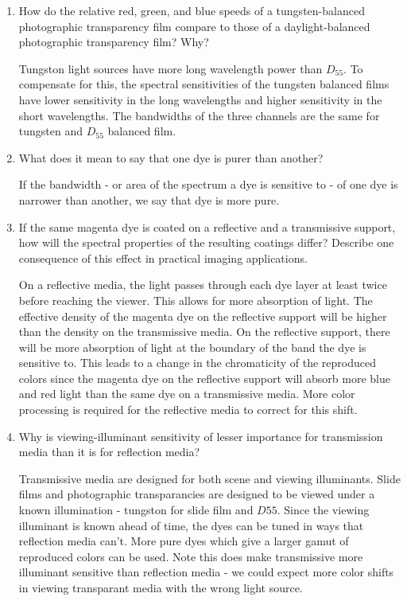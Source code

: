 \begin{enumerate}
\item  How do the relative red, green, and blue speeds of a
tungsten-balanced photographic transparency film compare to those
of a daylight-balanced photographic transparency film? Why?
\newline \par Tungston light sources have more long wavelength
power than $D_{55}$.  To compensate for this, the spectral
sensitivities of the tungsten balanced films have lower
sensitivity in the long wavelengths and higher sensitivity in the
short wavelengths.  The bandwidths of the three channels are the
same for tungsten and $D_{55}$ balanced film.
\newline

\item  What does it mean to say that one dye is purer than
another?
\newline \par If the bandwidth - or area of the spectrum a dye is
sensitive to - of one dye is narrower than another, we say that
dye is more pure.
\newline

\item   If the same magenta dye is coated on a reflective and a
transmissive support, how will the spectral properties of the
resulting coatings differ? Describe one consequence of this effect
in practical imaging applications.
\newline \par On a reflective media, the light passes through each dye layer at least twice
before reaching the viewer.  This allows for more absorption of
light.  The effective density of the magenta dye on the reflective
support will be higher than the density on the transmissive media.
On the reflective support, there will be more absorption of light
at the boundary of the band the dye is sensitive to.  This leads
to a change in the chromaticity of the reproduced colors since the
magenta dye on the reflective support will absorb more blue and
red light than the same dye on a transmissive media.  More color
processing is required for the reflective media to correct for
this shift.
\newline

\item   Why is viewing-illuminant sensitivity of lesser importance
for transmission media than it is for reflection media?
\newline \par Transmissive media are designed for both scene and
viewing illuminants.  Slide films and photographic transparancies
are designed to be viewed under a known illumination - tungston
for slide film and $D{55}$. Since the viewing illuminant is known
ahead of time, the dyes can be tuned in ways that reflection media
can't. More pure dyes which give a larger gamut of reproduced
colors can be used.  Note this does make transmissive more
illuminant sensitive than reflection media - we could expect more
color shifts in viewing transparant media with the wrong light
source.
\newline


\end{enumerate}
